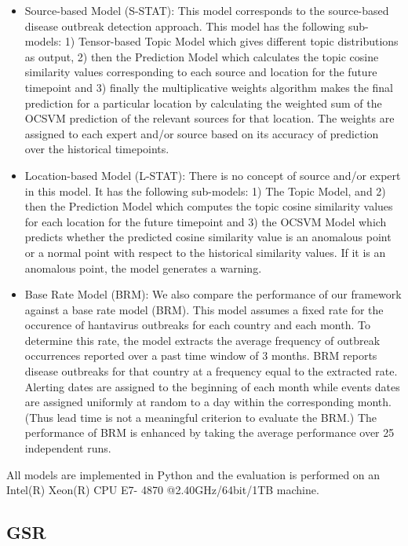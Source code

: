\documentclass[conference]{IEEEtran}
\begin{document}
\begin{itemize}

\item Source-based Model (S-STAT): This model corresponds to the source-based 
  disease outbreak detection approach. This model has the following sub-models:
  1) Tensor-based Topic Model which gives different topic distributions 
  as output, 2) then the Prediction Model which calculates the topic cosine similarity 
  values corresponding to each source and location for the future timepoint and 3) finally the multiplicative 
  weights algorithm makes the final prediction for a particular location by calculating 
  the weighted sum of the OCSVM prediction of the relevant sources for that location.
  The weights are assigned to each expert and/or source based on its accuracy of prediction 
  over the historical timepoints.
\item Location-based Model (L-STAT): There is no concept of source and/or expert 
  in this model. It has the following sub-models: 1) The Topic Model, and 2) then 
  the Prediction Model which computes the topic cosine similarity values for each location for the future timepoint
  and 3) the OCSVM Model which predicts whether the predicted cosine similarity value is an anomalous point or a normal
  point with respect to the historical similarity values. If it is an anomalous point, the model generates a warning.
\item Base Rate Model (BRM): We also compare the performance of our framework against a base rate model (BRM). This
    model assumes a fixed rate for the occurence of hantavirus outbreaks for each country and each 
    month. To determine this rate, the model extracts the average frequency of outbreak occurrences
    reported over a past time window of $3$ months. BRM reports disease outbreaks for that country at 
    a frequency equal to the extracted rate. Alerting dates are assigned to the beginning of each month
    while events dates are assigned uniformly at random to a day within the corresponding month. (Thus
    lead time is not a meaningful criterion to evaluate the BRM.) The performance of BRM is enhanced
    by taking the average performance over 25 independent runs.
\end{itemize}

All models are implemented in Python and the evaluation is performed on an Intel(R) Xeon(R) CPU E7- 4870 @2.40GHz/64bit/1TB machine.


\subsection{GSR}
\end{document}
